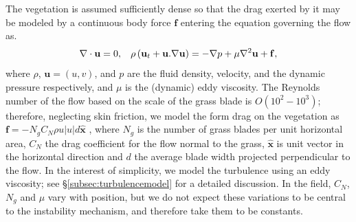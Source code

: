 \documentclass{jfm}
\newcommand{\bx}{{\boldsymbol{\hat{x}}}}
\newcommand{\bu}{\mathbf{u}}
\newcommand{\grad}{\mathbf{\nabla}}
\begin{document}
The vegetation is assumed sufficiently dense so that the drag exerted by it may be modeled by a continuous body force $\mathbf{f}$ entering the equation governing the flow as.
\begin{equation}
\grad\cdot\bu = 0,\hspace{3mm} \rho \left(\bu_{t}+\bu.\grad\bu \right) = -\grad p+\mu\grad^{2}\bu +\mathbf{f}, %
\label{navier-stokes}
\end{equation}
where $\rho$, $\bu=(u,v)$, and $p$ are the fluid density, velocity, and the dynamic pressure respectively, and $\mu$ is the (dynamic) eddy viscosity. %
The Reynolds number of the flow based on the scale of the grass blade is $O(10^2-10^3)$; therefore, neglecting skin friction, we model the form drag on the vegetation as $\mathbf{f}=-N_g C_N \rho u |u| d\bx$ \citep{Nepf99,Nepf00,Nepf04}, where  $N_g$ is the number of grass blades per unit horizontal area, $C_{N}$ the drag coefficient for the flow normal to the grass, $\bx$ is unit vector in the horizontal direction and $d$ the average blade width projected perpendicular to the flow. 
In the interest of simplicity, we model the turbulence using an eddy viscosity; see \S\ref{subsec:turbulencemodel} for a detailed discussion. 
In the field, $C_N$, $N_g$ and $\mu$ vary with position, but we do not expect these variations to be central to the instability mechanism, and therefore take them to be constants. 
\end{document}
